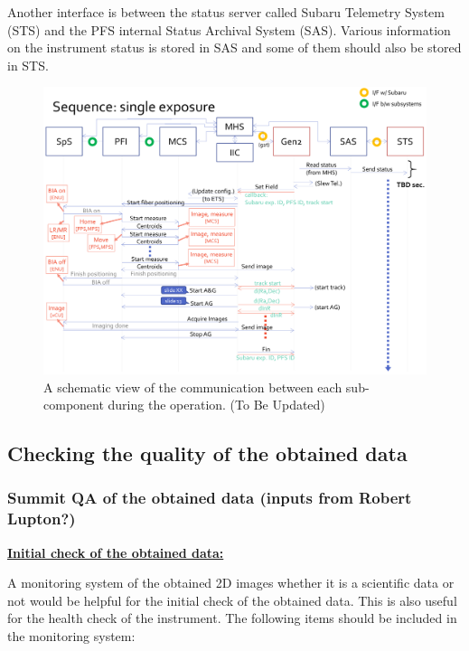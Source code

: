 \documentclass[a4paper]{article}
\begin{document}
Another interface is between the status server called Subaru Telemetry
System (STS) and the PFS internal Status Archival System
(SAS). Various information on the instrument status is stored in SAS
and some of them should also be stored in STS.

\begin{figure}[!htb]
\begin{center}
\includegraphics[scale=0.2]{./figures/PFS_sequence_process.pdf}
\end{center}
\caption{A schematic view of the communication between each sub-component during the operation. (To Be Updated)\label{fig:single_exposure_sequence2}}
\end{figure}

\subsection{Checking the quality of the obtained data}
\subsubsection{Summit QA of the obtained data (inputs from Robert Lupton?)}
\noindent \underline{\textbf{Initial check of the obtained data:}}
\vspace{5pt}

A monitoring system of the obtained 2D images whether it is a scientific data or not would be helpful for the initial check of the obtained data. This is also useful for the health check of the instrument. The following items should be included in the monitoring system:\\
\end{document}
